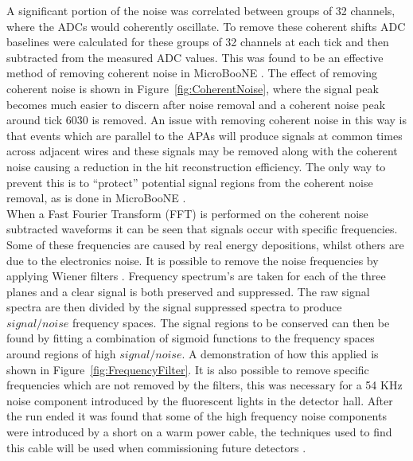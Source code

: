 A significant portion of the noise was correlated between groups of 32 channels, where the ADCs would coherently oscillate. To remove these coherent shifts ADC baselines were calculated for these groups of 32 channels at each tick and then subtracted from the measured ADC values. This was found to be an effective method of removing coherent noise in MicroBooNE \citep{uBooNENoise}. The effect of removing coherent noise is shown in Figure~\ref{fig:CoherentNoise}, where the signal peak becomes much easier to discern after noise removal and a coherent noise peak around tick 6030 is removed. An issue with removing coherent noise in this way is that events which are parallel to the APAs will produce signals at common times across adjacent wires and these signals may be removed along with the coherent noise causing a reduction in the hit reconstruction efficiency. The only way to prevent this is to ``protect'' potential signal regions from the coherent noise removal, as is done in MicroBooNE \citep{uBooNENoise}. \\

When a Fast Fourier Transform (FFT) \citep{CoTuFFT} is performed on the coherent noise subtracted waveforms it can be seen that signals occur with specific frequencies. Some of these frequencies are caused by real energy depositions, whilst others are due to the electronics noise. It is possible to remove the noise frequencies by applying Wiener filters \citep{WienerFilter}. Frequency spectrum's are taken for each of the three planes and a clear signal is both preserved and suppressed. The raw signal spectra are then divided by the signal suppressed spectra to produce $signal/noise$ frequency spaces. The signal regions to be conserved can then be found by fitting a combination of sigmoid functions to the frequency spaces around regions of high $signal/noise$. A demonstration of how this applied is shown in Figure~\ref{fig:FrequencyFilter}. It is also possible to remove specific frequencies which are not removed by the filters, this was necessary for a 54 KHz noise component introduced by the fluorescent lights in the detector hall. After the run ended it was found that some of the high frequency noise components were introduced by a short on a warm power cable, the techniques used to find this cable will be used when commissioning future detectors \citep{35tonNoiseMeeting}. \\

